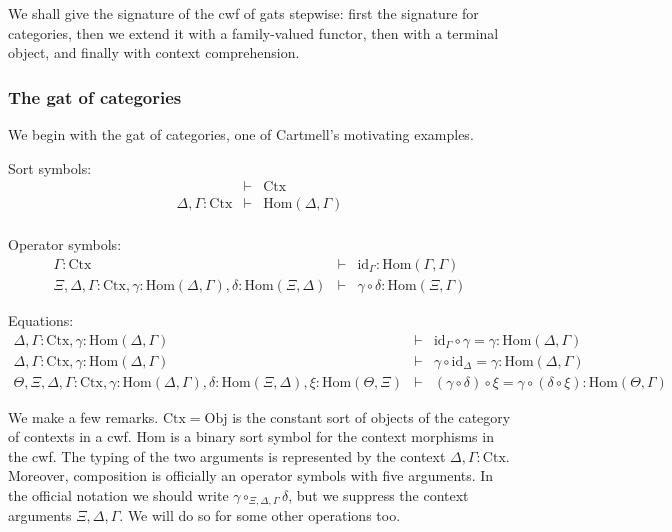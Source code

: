 \documentclass{lmcs}
\def\Obj{\mathrm{Obj}}
\def\Ctx{\mathrm{Ctx}}
\def\Hom{\mathrm{Hom}}
\def\id{\mathrm{id}}
\begin{document}
We shall give the signature of the cwf of gats stepwise: first the signature for categories, then we extend it with a family-valued functor, then with a terminal object, and finally with context comprehension.

\subsubsection{The gat of categories} We begin with the gat of categories, one of Cartmell's motivating examples.

Sort symbols:
\begin{eqnarray*}
&\vdash& \Ctx\\
\Delta, \Gamma : \Ctx &\vdash& \Hom(\Delta,\Gamma)\\
\end{eqnarray*}

Operator symbols:
\begin{eqnarray*}
\Gamma : \Ctx &\vdash& \id_\Gamma : \Hom(\Gamma,\Gamma)\\
\Xi,\Delta,\Gamma : \Ctx, \gamma : \Hom(\Delta,\Gamma), \delta : \Hom(\Xi,\Delta) &\vdash&
\gamma \circ \delta : \Hom(\Xi,\Gamma)
\end{eqnarray*}

Equations:
\begin{eqnarray*}
\Delta, \Gamma : \Ctx, \gamma : \Hom(\Delta,\Gamma) &\vdash& \id_\Gamma \circ \gamma = \gamma : \Hom(\Delta,\Gamma)\\
\Delta, \Gamma : \Ctx, \gamma : \Hom(\Delta,\Gamma) &\vdash& \gamma \circ \id_\Delta = \gamma : \Hom(\Delta,\Gamma)\\
\Theta, \Xi,\Delta,\Gamma : \Ctx, \gamma : \Hom(\Delta,\Gamma), \delta : \Hom(\Xi,\Delta), \xi : \Hom(\Theta,\Xi) &\vdash&
(\gamma \circ \delta) \circ \xi = \gamma \circ (\delta \circ \xi): \Hom(\Theta,\Gamma)
\end{eqnarray*}

We make a few remarks. $\Ctx = \Obj$ is the constant sort of objects of the category of contexts in a cwf. $\Hom$ is a binary sort symbol for the context morphisms in the cwf. The typing of the two arguments is represented by the context $\Delta, \Gamma : \Ctx$. 
Moreover, composition is officially an operator symbols with five arguments. In the official notation we should write $\gamma \circ_{\Xi,\Delta,\Gamma} \delta$, but we suppress the context arguments $\Xi,\Delta,\Gamma$. We will do so for some other operations too.
\end{document}
